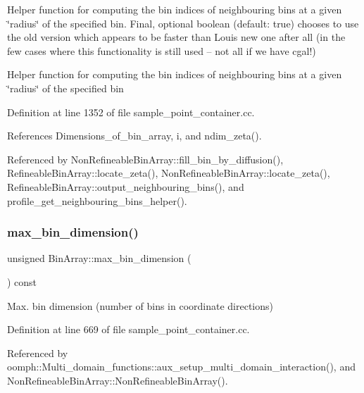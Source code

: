 Helper function for computing the bin indices of neighbouring bins at a given \char`\"{}radius\char`\"{} of the specified bin. Final, optional boolean (default\+: true) chooses to use the old version which appears to be faster than Louis\textquotesingle{} new one after all (in the few cases where this functionality is still used -- not all if we have cgal!) 

Helper function for computing the bin indices of neighbouring bins at a given \char`\"{}radius\char`\"{} of the specified bin 

Definition at line 1352 of file sample\+\_\+point\+\_\+container.\+cc.



References Dimensions\+\_\+of\+\_\+bin\+\_\+array, i, and ndim\+\_\+zeta().



Referenced by Non\+Refineable\+Bin\+Array\+::fill\+\_\+bin\+\_\+by\+\_\+diffusion(), Refineable\+Bin\+Array\+::locate\+\_\+zeta(), Non\+Refineable\+Bin\+Array\+::locate\+\_\+zeta(), Refineable\+Bin\+Array\+::output\+\_\+neighbouring\+\_\+bins(), and profile\+\_\+get\+\_\+neighbouring\+\_\+bins\+\_\+helper().

\mbox{\label{classBinArray_a1bd867e26195feb7ae95a8e77acadca8}} 
\subsubsection{\texorpdfstring{max\+\_\+bin\+\_\+dimension()}{max\_bin\_dimension()}}
{\footnotesize\ttfamily unsigned Bin\+Array\+::max\+\_\+bin\+\_\+dimension (\begin{DoxyParamCaption}{ }\end{DoxyParamCaption}) const}



Max. bin dimension (number of bins in coordinate directions) 



Definition at line 669 of file sample\+\_\+point\+\_\+container.\+cc.



Referenced by oomph\+::\+Multi\+\_\+domain\+\_\+functions\+::aux\+\_\+setup\+\_\+multi\+\_\+domain\+\_\+interaction(), and Non\+Refineable\+Bin\+Array\+::\+Non\+Refineable\+Bin\+Array().

